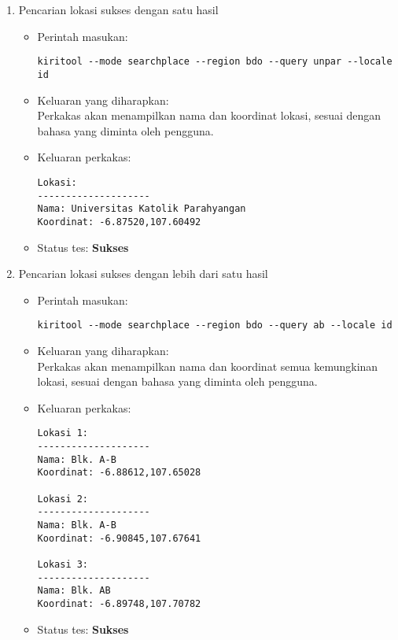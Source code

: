 \begin{enumerate}
	\item Pencarian lokasi sukses dengan satu hasil
	\begin{itemize}
		\item Perintah masukan:
		\begin{lstlisting}
kiritool --mode searchplace --region bdo --query unpar --locale id
		\end{lstlisting}
		\item Keluaran yang diharapkan: \\
		Perkakas akan menampilkan nama dan koordinat \latlon lokasi, sesuai dengan bahasa yang diminta oleh pengguna.
		\item Keluaran perkakas:
		\begin{lstlisting}
Lokasi:
--------------------
Nama: Universitas Katolik Parahyangan
Koordinat: -6.87520,107.60492
		\end{lstlisting}
		\item Status tes: \textbf{Sukses}
	\end{itemize}
	
	\item Pencarian lokasi sukses dengan lebih dari satu hasil
	\begin{itemize}
		\item Perintah masukan:
		\begin{lstlisting}
kiritool --mode searchplace --region bdo --query ab --locale id
		\end{lstlisting}
		\item Keluaran yang diharapkan: \\
		Perkakas akan menampilkan nama dan koordinat \latlon semua kemungkinan lokasi, sesuai dengan bahasa yang diminta oleh pengguna.
		\item Keluaran perkakas:
		\begin{lstlisting}
Lokasi 1:
--------------------
Nama: Blk. A-B
Koordinat: -6.88612,107.65028

Lokasi 2:
--------------------
Nama: Blk. A-B
Koordinat: -6.90845,107.67641

Lokasi 3:
--------------------
Nama: Blk. AB
Koordinat: -6.89748,107.70782
		\end{lstlisting}
		\item Status tes: \textbf{Sukses}
	\end{itemize}
	

\end{enumerate}
